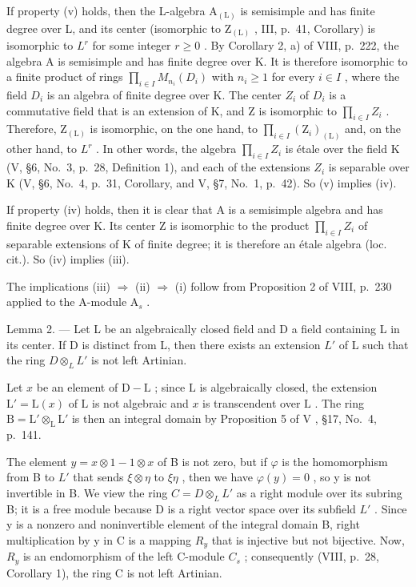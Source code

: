 If property (v) holds, then the L-algebra \(\mathrm{A}_{(\mathrm{L})}\) is semisimple and has finite degree over L, and its center (isomorphic to \(\mathrm{Z}_{(\mathrm{L})}\) , III, p.~41, Corollary) is isomorphic to \(L^{r}\) for some integer \(r \geqslant 0\) . By Corollary 2, a) of VIII, p.~222, the algebra A is semisimple and has finite degree over K. It is therefore isomorphic to a finite product of rings \(\prod_{i \in I} M_{n_{i}}(D_{i})\) with \(n_{i} \geqslant 1\) for every \(i \in I\) , where the field \(D_{i}\) is an algebra of finite degree over K. The center \(Z_{i}\) of \(D_{i}\) is a commutative field that is an extension of K, and Z is isomorphic to \(\prod_{i \in I} Z_{i}\) . Therefore, \(\mathrm{Z}_{(\mathrm{L})}\) is isomorphic, on the one hand, to \(\prod_{i \in I} (\mathrm{Z}_{i})_{(\mathrm{L})}\) and, on the other hand, to \(L^{r}\) . In other words, the algebra \(\prod_{i \in I} Z_{i}\) is étale over the field K (V, §6, No.~3, p.~28, Definition 1), and each of the extensions \(Z_{i}\) is separable over K (V, §6, No.~4, p.~31, Corollary, and V, §7, No.~1, p.~42). So (v) implies (iv).

If property (iv) holds, then it is clear that A is a semisimple algebra and has finite degree over K. Its center Z is isomorphic to the product \(\prod_{i\in I}Z_{i}\) of separable extensions of K of finite degree; it is therefore an étale algebra (loc. cit.). So (iv) implies (iii).

The implications (iii) \(\Rightarrow\) (ii) \(\Rightarrow\) (i) follow from Proposition 2 of VIII, p.~230 applied to the A-module \(\mathrm{A}_s\) .

Lemma 2. --- Let L be an algebraically closed field and D a field containing L in its center. If D is distinct from L, then there exists an extension \(L'\) of L such that the ring \(D \otimes_{L} L'\) is not left Artinian.

Let \(x\) be an element of \(\mathrm{D} - \mathrm{L}\) ; since \(\mathrm{L}\) is algebraically closed, the extension \(\mathrm{L}' = \mathrm{L}(x)\) of \(\mathrm{L}\) is not algebraic and \(x\) is transcendent over \(\mathrm{L}\) . The ring \(\mathrm{B} = \mathrm{L}' \otimes_{\mathrm{L}} \mathrm{L}'\) is then an integral domain by Proposition 5 of \(\mathrm{V}\) , §17, No.~4, p.~141.

The element \(y = x \otimes 1 - 1 \otimes x\) of B is not zero, but if \(\varphi\) is the homomorphism from B to \(L'\) that sends \(\xi \otimes \eta\) to \(\xi \eta\) , then we have \(\varphi(y) = 0\) , so y is not invertible in B. We view the ring \(C = D \otimes_{L} L'\) as a right module over its subring B; it is a free module because D is a right vector space over its subfield \(L'\) . Since y is a nonzero and noninvertible element of the integral domain B, right multiplication by y in C is a mapping \(R_y\) that is injective but not bijective. Now, \(R_y\) is an endomorphism of the left C-module \(C_s\) ; consequently (VIII, p.~28, Corollary 1), the ring C is not left Artinian.

